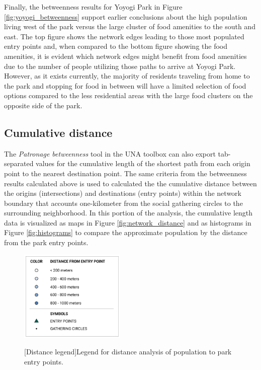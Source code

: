\begin{multicols}{2}

Finally, the betweenness results for Yoyogi Park in Figure \ref{fig:yoyogi_betweenness} support earlier conclusions about the high population living west of the park versus the large cluster of food amenities to the south and east. The top figure shows the network edges leading to those most populated entry points and, when compared to the bottom figure showing the food amenities, it is evident which network edges might benefit from food amenities due to the number of people utilizing those paths to arrive at Yoyogi Park. However, as it exists currently, the majority of residents traveling from home to the park and stopping for food in between will have a limited selection of food options compared to the less residential areas with the large food clusters on the opposite side of the park. 

\subsection{Cumulative distance}

The \textit{Patronage betweenness} tool in the UNA toolbox can also export tab-separated values for the cumulative length of the shortest path from each origin point to the nearest destination point. The same criteria from the betweenness results calculated above is used to calculated the the cumulative distance between the origins (intersections) and destinations (entry points) within the network boundary that accounts one-kilometer from the social gathering circles to the surrounding neighborhood. In this portion of the analysis, the cumulative length data is visualized as maps in Figure \ref{fig:network_distance} and as histograms in Figure \ref{fig:histograms} to compare the approximate population by the distance from the park entry points. 

\begin{figure}[H]
  \centering
  \includegraphics[width=0.45\textwidth]{images/network/distance_legend.png}\par{}[Distance legend]{Legend for distance analysis of population to park entry points.}
  \label{fig:distance_legend}
\end{figure} 



\end{multicols}
